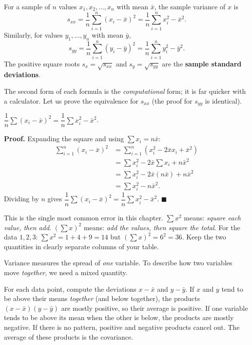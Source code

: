 \documentclass[11pt]{article}
\newcommand{\cle}[1]{{\popxbold\color{popdark}#1}}
\newcounter{popsec}
\newcounter{popsub}
\newcommand{\courssub}[1]{%
  \stepcounter{popsub}%
  \par\vspace{9pt}\noindent{\popxbold\fontsize{11.5}{13}\selectfont\color{popink}{\color{poporange}\thepopsec.\thepopsub}\hspace{6pt}#1}\par\nopagebreak\vspace{4pt}
}
\begin{document}
\begin{definition}
For a sample of $n$ values $x_1,x_2,\dots,x_n$ with mean $\bar{x}$, the \cle{sample variance} of $x$ is
\[ s_{xx}=\frac{1}{n}\sum_{i=1}^{n}(x_i-\bar{x})^2=\frac{1}{n}\sum_{i=1}^{n}x_i^2-\bar{x}^2. \]
Similarly, for values $y_1,\dots,y_n$ with mean $\bar{y}$,
\[ s_{yy}=\frac{1}{n}\sum_{i=1}^{n}(y_i-\bar{y})^2=\frac{1}{n}\sum_{i=1}^{n}y_i^2-\bar{y}^2. \]
The positive square roots $s_x=\sqrt{s_{xx}}$ and $s_y=\sqrt{s_{yy}}$ are the \textbf{sample standard deviations}.
\end{definition}

The second form of each formula is the \emph{computational} form; it is far quicker with a calculator. Let us prove the equivalence for $s_{xx}$ (the proof for $s_{yy}$ is identical).

\begin{propriete}
$\dfrac{1}{n}\sum (x_i-\bar{x})^2=\dfrac{1}{n}\sum x_i^2-\bar{x}^2$.
\end{propriete}

\textbf{Proof.} Expanding the square and using $\sum x_i=n\bar{x}$:
\begin{align*}
\sum_{i=1}^{n}(x_i-\bar{x})^2 &=\sum_{i=1}^{n}\left(x_i^2-2\bar{x}x_i+\bar{x}^2\right)\\
&=\sum x_i^2-2\bar{x}\sum x_i+n\bar{x}^2\\
&=\sum x_i^2-2\bar{x}(n\bar{x})+n\bar{x}^2\\
&=\sum x_i^2-n\bar{x}^2.
\end{align*}
Dividing by $n$ gives $\dfrac{1}{n}\sum(x_i-\bar{x})^2=\dfrac{1}{n}\sum x_i^2-\bar{x}^2$. $\blacksquare$

\begin{attention}
This is the single most common error in this chapter. $\sum x^2$ means: \emph{square each value, then add}. $(\sum x)^2$ means: \emph{add the values, then square the total}. For the data $1,2,3$: $\sum x^2=1+4+9=14$ but $(\sum x)^2=6^2=36$. Keep the two quantities in clearly separate columns of your table.
\end{attention}

\courssub{Sample Covariance}

Variance measures the spread of \emph{one} variable. To describe how two variables move \emph{together}, we need a mixed quantity.

\begin{experience}
For each data point, compute the deviations $x-\bar{x}$ and $y-\bar{y}$. If $x$ and $y$ tend to be above their means \emph{together} (and below together), the products $(x-\bar{x})(y-\bar{y})$ are mostly positive, so their average is positive. If one variable tends to be above its mean when the other is below, the products are mostly negative. If there is no pattern, positive and negative products cancel out. The average of these products is the covariance.
\end{experience}
\end{document}
